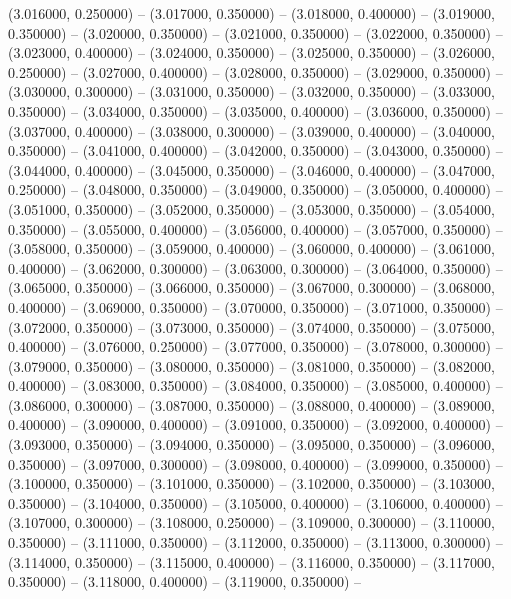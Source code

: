(3.016000, 0.250000) -- 
(3.017000, 0.350000) -- 
(3.018000, 0.400000) -- 
(3.019000, 0.350000) -- 
(3.020000, 0.350000) -- 
(3.021000, 0.350000) -- 
(3.022000, 0.350000) -- 
(3.023000, 0.400000) -- 
(3.024000, 0.350000) -- 
(3.025000, 0.350000) -- 
(3.026000, 0.250000) -- 
(3.027000, 0.400000) -- 
(3.028000, 0.350000) -- 
(3.029000, 0.350000) -- 
(3.030000, 0.300000) -- 
(3.031000, 0.350000) -- 
(3.032000, 0.350000) -- 
(3.033000, 0.350000) -- 
(3.034000, 0.350000) -- 
(3.035000, 0.400000) -- 
(3.036000, 0.350000) -- 
(3.037000, 0.400000) -- 
(3.038000, 0.300000) -- 
(3.039000, 0.400000) -- 
(3.040000, 0.350000) -- 
(3.041000, 0.400000) -- 
(3.042000, 0.350000) -- 
(3.043000, 0.350000) -- 
(3.044000, 0.400000) -- 
(3.045000, 0.350000) -- 
(3.046000, 0.400000) -- 
(3.047000, 0.250000) -- 
(3.048000, 0.350000) -- 
(3.049000, 0.350000) -- 
(3.050000, 0.400000) -- 
(3.051000, 0.350000) -- 
(3.052000, 0.350000) -- 
(3.053000, 0.350000) -- 
(3.054000, 0.350000) -- 
(3.055000, 0.400000) -- 
(3.056000, 0.400000) -- 
(3.057000, 0.350000) -- 
(3.058000, 0.350000) -- 
(3.059000, 0.400000) -- 
(3.060000, 0.400000) -- 
(3.061000, 0.400000) -- 
(3.062000, 0.300000) -- 
(3.063000, 0.300000) -- 
(3.064000, 0.350000) -- 
(3.065000, 0.350000) -- 
(3.066000, 0.350000) -- 
(3.067000, 0.300000) -- 
(3.068000, 0.400000) -- 
(3.069000, 0.350000) -- 
(3.070000, 0.350000) -- 
(3.071000, 0.350000) -- 
(3.072000, 0.350000) -- 
(3.073000, 0.350000) -- 
(3.074000, 0.350000) -- 
(3.075000, 0.400000) -- 
(3.076000, 0.250000) -- 
(3.077000, 0.350000) -- 
(3.078000, 0.300000) -- 
(3.079000, 0.350000) -- 
(3.080000, 0.350000) -- 
(3.081000, 0.350000) -- 
(3.082000, 0.400000) -- 
(3.083000, 0.350000) -- 
(3.084000, 0.350000) -- 
(3.085000, 0.400000) -- 
(3.086000, 0.300000) -- 
(3.087000, 0.350000) -- 
(3.088000, 0.400000) -- 
(3.089000, 0.400000) -- 
(3.090000, 0.400000) -- 
(3.091000, 0.350000) -- 
(3.092000, 0.400000) -- 
(3.093000, 0.350000) -- 
(3.094000, 0.350000) -- 
(3.095000, 0.350000) -- 
(3.096000, 0.350000) -- 
(3.097000, 0.300000) -- 
(3.098000, 0.400000) -- 
(3.099000, 0.350000) -- 
(3.100000, 0.350000) -- 
(3.101000, 0.350000) -- 
(3.102000, 0.350000) -- 
(3.103000, 0.350000) -- 
(3.104000, 0.350000) -- 
(3.105000, 0.400000) -- 
(3.106000, 0.400000) -- 
(3.107000, 0.300000) -- 
(3.108000, 0.250000) -- 
(3.109000, 0.300000) -- 
(3.110000, 0.350000) -- 
(3.111000, 0.350000) -- 
(3.112000, 0.350000) -- 
(3.113000, 0.300000) -- 
(3.114000, 0.350000) -- 
(3.115000, 0.400000) -- 
(3.116000, 0.350000) -- 
(3.117000, 0.350000) -- 
(3.118000, 0.400000) -- 
(3.119000, 0.350000) -- 
